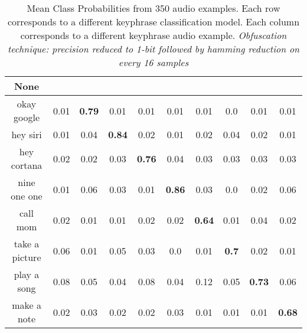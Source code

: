 \begin{table}[!th]
\begin{tabular}{cccccccccc}%
\hline%
None&\rotate{random talk}{70}&\rotate{okay google}{70}&\rotate{hey siri}{70}&\rotate{hey cortana}{70}&\rotate{nine one one}{70}&\rotate{call mom}{70}&\rotate{take a picture}{70}&\rotate{play a song}{70}&\rotate{make a note}{70}\\%
\hline%
okay google&0.01&\textbf{0.79}&0.01&0.01&0.01&0.01&0.0&0.01&0.01\\%
hey siri&0.01&0.04&\textbf{0.84}&0.02&0.01&0.02&0.04&0.02&0.01\\%
hey cortana&0.02&0.02&0.03&\textbf{0.76}&0.04&0.03&0.03&0.03&0.03\\%
nine one one&0.01&0.06&0.03&0.01&\textbf{0.86}&0.03&0.0&0.02&0.06\\%
call mom&0.02&0.01&0.01&0.02&0.02&\textbf{0.64}&0.01&0.04&0.02\\%
take a picture&0.06&0.01&0.05&0.03&0.0&0.01&\textbf{0.7}&0.02&0.01\\%
play a song&0.08&0.05&0.04&0.08&0.04&0.12&0.05&\textbf{0.73}&0.06\\%
make a note&0.02&0.03&0.02&0.02&0.03&0.01&0.01&0.01&\textbf{0.68}\\%
\hline%
\end{tabular}
\caption{Mean Class Probabilities from 350 audio examples. Each row corresponds to a different keyphrase classification model. Each column corresponds to a different keyphrase audio example. \emph{Obfuscation technique: precision reduced to 1-bit followed by hamming reduction on every 16 samples}}
\label{tab:probs_precision_1_hamming_16}
\end{table}%


\clearpage
